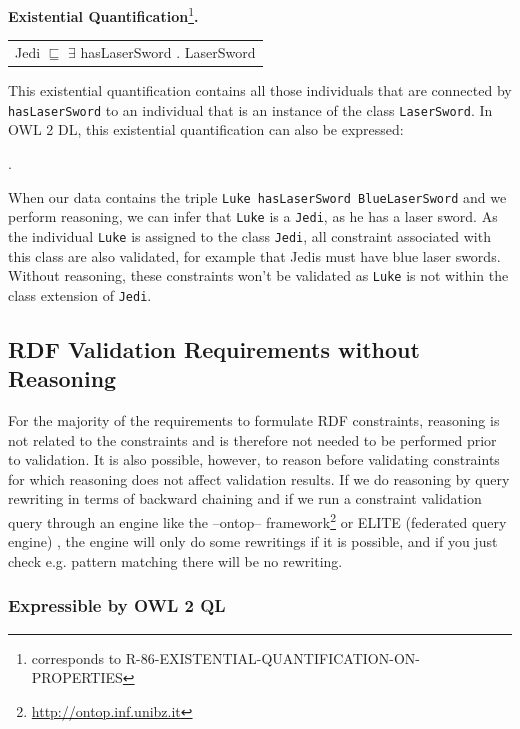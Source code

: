 \documentclass{llncs}
\newcommand{\ms}[1]{\texttt{#1}}
\newenvironment{DL}{
  \scriptsize
  \sffamily
  \vspace{0.3cm}
  \begin{tabular}{l}

}{
  \end{tabular}
  \linebreak
}
\begin{document}
\textbf{Existential Quantification}\footnote{corresponds to R-86-EXISTENTIAL-QUANTIFICATION-ON-PROPERTIES}\textbf{.}

\begin{DL}
Jedi $\sqsubseteq$ $\exists$ hasLaserSword . LaserSword
\end{DL}

This existential quantification contains all those individuals that are connected by \ms{hasLaserSword} to an individual that is an instance of the class \ms{LaserSword}.
In OWL 2 DL, this existential quantification can also be expressed:

\begin{ex}
 .
\end{ex}

When our data contains the triple \ms{Luke hasLaserSword BlueLaserSword} and we perform reasoning, we can infer that \ms{Luke} is a \ms{Jedi}, as he has a laser sword.
As the individual \ms{Luke} is assigned to the class \ms{Jedi}, all constraint associated with this class are also validated, for example that Jedis must have blue laser swords.
Without reasoning, these constraints won't be validated as \ms{Luke} is not within the class extension of \ms{Jedi}.

\subsection{RDF Validation Requirements without Reasoning}

For the majority of the requirements to formulate RDF constraints, reasoning is not related to the constraints and is therefore not needed to be performed prior to validation. 
It is also possible, however, to reason before validating constraints for which reasoning does not affect validation results.
If we do reasoning by query rewriting in terms of backward chaining and if we run a constraint validation query through an engine like the --ontop-- framework\footnote{\url{http://ontop.inf.unibz.it}} or ELITE (federated query engine) \cite{nolle2013elite}, the engine will only do some rewritings if it is possible, and if you just check e.g. pattern matching there will be no rewriting.

\subsubsection{Expressible by OWL 2 QL}
\end{document}
